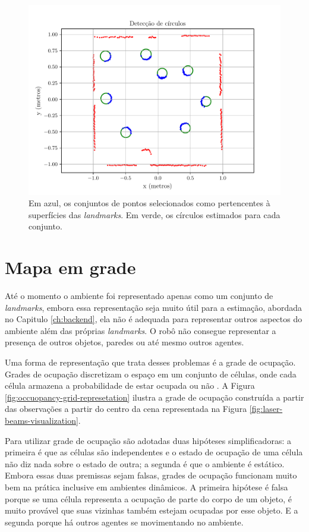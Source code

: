 \begin{figure}[]
  \centering
  \includegraphics[width=.8\textwidth]{figs/circle_detection.pdf}
  \caption{Em azul, os conjuntos de pontos selecionados como pertencentes à superfícies das \textit{landmarks}. Em verde, os círculos 
  estimados para cada conjunto.}
  \label{fig:detected-circles}
\end{figure}

\section{Mapa em grade}
Até o momento o ambiente foi representado apenas como um conjunto de 
\textit{landmarks}, embora essa representação seja muito útil para a 
estimação, abordada no Capitulo \ref{ch:backend}, ela não é adequada 
para representar outros aspectos do ambiente além das próprias \textit{landmarks}. O robô não consegue representar a presença de outros 
objetos, paredes ou até mesmo outros agentes.

Uma forma de representação que trata desses problemas é a grade de 
ocupação. Grades de ocupação discretizam o espaço em um conjunto de 
células, onde cada célula armazena a probabilidade de estar ocupada ou 
não \cite{elfes1989using}. A Figura \ref{fig:occuopancy-grid-represetation} ilustra a grade de ocupação construída a 
partir das observações a partir do centro da cena representada na Figura 
\ref{fig:laser-beams-visualization}.

Para utilizar grade de ocupação são adotadas duas hipóteses 
simplificadoras: a primeira é que as células são independentes e o 
estado de ocupação de uma célula não diz nada sobre o estado de outra; a 
segunda é que o ambiente é estático. Embora essas duas premissas sejam 
falsas, grades de ocupação funcionam muito bem na prática inclusive em 
ambientes dinâmicos. A primeira hipótese é falsa porque se uma célula 
representa a ocupação de parte do corpo de um objeto, é muito provável 
que suas vizinhas também estejam ocupadas por esse objeto. E a segunda 
porque há outros agentes se movimentando no ambiente.

